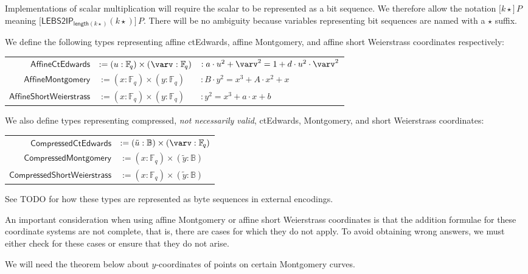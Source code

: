 \documentclass{article}
\newcommand{\typecolon}{:}
\newcommand{\bit}{\mathbb{B}}
\newcommand{\Field}[1]{\mathbb{F}_{\!#1}}
\newcommand{\length}{\mathsf{length}}
\newcommand{\mult}{\cdot}
\newcommand{\scalarmult}[2]{\boldsymbol{[}{#1}\boldsymbol{]}\,{#2}}
\newcommand{\Repr}{\star}
\newcommand{\AffineCtEdwards}{\mathsf{AffineCtEdwards}}
\newcommand{\AffineMontgomery}{\mathsf{AffineMontgomery}}
\newcommand{\AffineShortWeierstrass}{\mathsf{AffineShortWeierstrass}}
\newcommand{\CompressedCtEdwards}{\mathsf{CompressedCtEdwards}}
\newcommand{\CompressedMontgomery}{\mathsf{CompressedMontgomery}}
\newcommand{\CompressedShortWeierstrass}{\mathsf{CompressedShortWeierstrass}}
\newcommand{\LEBStoIP}[1]{\mathsf{LEBS2IP}_{#1}}
\begin{document}
Implementations of scalar multiplication will require the scalar to be represented
as a bit sequence. We therefore allow the notation $\scalarmult{k\Repr}{P}$ meaning
$\scalarmult{\LEBStoIP{\length(k\Repr)}(k\Repr)}{P}$. There will be no ambiguity
because variables representing bit sequences are named with a $\Repr$ suffix.

We define the following types representing affine ctEdwards, affine Montgomery,
and affine short Weierstrass coordinates respectively:

\begin{tabular}{@{\hskip 2em}r@{\;}l@{\;}l}
  $\AffineCtEdwards$        &$:= (u \typecolon \Field{q}) \times (\hspace{0.04em}\varv\hspace{0.04em} \typecolon \Field{q})$
    &$: a \mult u^2 + \varv^2 = 1 + d \mult u^2 \mult \varv^2$ \\
  $\AffineMontgomery$       &$:= (x \typecolon \Field{q}) \times (y \typecolon \Field{q})$
    &$: B \mult y^2 = x^3 + A \mult x^2 + x$ \\
  $\AffineShortWeierstrass$ &$:= (x \typecolon \Field{q}) \times (y \typecolon \Field{q})$
    &$: y^2 = x^3 + a \mult x + b$
\end{tabular}

We also define types representing compressed, \emph{not necessarily valid},
ctEdwards, Montgomery, and short Weierstrass coordinates:

\begin{tabular}{@{\hskip 2em}r@{\;}l}
  $\CompressedCtEdwards$        &$:= (\tilde{u} \typecolon \bit) \times (\varv \typecolon \Field{q})$ \\
  $\CompressedMontgomery$       &$:= (x \typecolon \Field{q}) \times (\tilde{y} \typecolon \bit)$ \\
  $\CompressedShortWeierstrass$ &$:= (x \typecolon \Field{q}) \times (\tilde{y} \typecolon \bit)$
\end{tabular}

See TODO for how these types are represented as byte sequences in external encodings.

An important consideration when using affine Montgomery or affine short Weierstrass coordinates
is that the addition formulae for these coordinate systems are not complete, that is, there are
cases for which they do not apply. To avoid obtaining wrong answers, we must either check for
these cases or ensure that they do not arise.

We will need the theorem below about $y$-coordinates of points on certain Montgomery curves.
\end{document}
